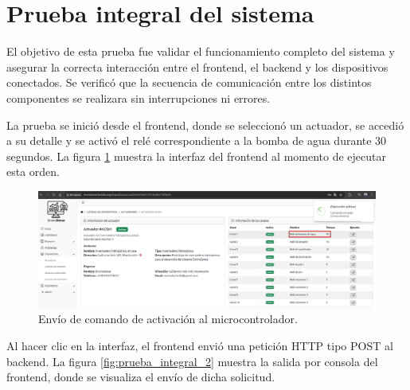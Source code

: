 \section{Prueba integral del sistema}




El objetivo de esta prueba fue validar el funcionamiento completo del sistema y
asegurar la correcta interacción entre el frontend, el backend y los
dispositivos conectados. Se verificó que la secuencia de comunicación entre los
distintos componentes se realizara sin interrupciones ni errores.

La prueba se inició desde el frontend, donde se seleccionó un actuador, se
accedió a su detalle y se activó el relé correspondiente a la bomba de agua
durante 30 segundos. La figura \ref{fig:prueba_integral_1} muestra la interfaz
del frontend al momento de ejecutar esta orden.

\begin{figure}[H]
    \centering
    \includegraphics[width=\textwidth]{Images/59_prueba_integral_1.png}
    \caption[Envío de comando de activación al microcontrolador]{Envío de comando de activación al microcontrolador.}
    \label{fig:prueba_integral_1}
\end{figure}

Al hacer clic en la interfaz, el frontend envió una petición HTTP tipo POST al
backend. La figura \ref{fig:prueba_integral_2} muestra la salida por consola
del frontend, donde se visualiza el envío de dicha solicitud.

